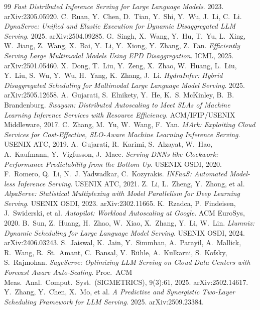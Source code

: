 \begin{thebibliography}{99}
\emph{Fast Distributed Inference Serving for Large Language Models}.
2023. arXiv:2305.05920.
C.~Ruan, Y.~Chen, D.~Tian, Y.~Shi, Y.~Wu, J.~Li, C.~Li.
\emph{DynaServe: Unified and Elastic Execution for Dynamic Disaggregated
LLM Serving}.
2025. arXiv:2504.09285.
G.~Singh, X.~Wang, Y.~Hu, T.~Yu, L.~Xing, W.~Jiang, Z.~Wang, X.~Bai,
Y.~Li, Y.~Xiong, Y.~Zhang, Z.~Fan.
\emph{Efficiently Serving Large Multimodal Models Using EPD
Disaggregation}.
ICML, 2025. arXiv:2501.05460.
X.~Dong, T.~Liu, Y.~Zeng, X.~Zhao, W.~Huang, L.~Liu, Y.~Liu, S.~Wu,
Y.~Wu, H.~Yang, K.~Zhang, J.~Li.
\emph{HydraInfer: Hybrid Disaggregated Scheduling for Multimodal Large
Language Model Serving}.
2025. arXiv:2505.12658.
A.~Gujarati, S.~Elnikety, Y.~He, K.~S. McKinley, B.~B. Brandenburg.
\emph{Swayam: Distributed Autoscaling to Meet SLAs of Machine Learning
Inference Services with Resource Efficiency}.
ACM/IFIP/USENIX Middleware, 2017.
C.~Zhang, M.~Yu, W.~Wang, F.~Yan.
\emph{MArk: Exploiting Cloud Services for Cost-Effective, SLO-Aware
Machine Learning Inference Serving}.
USENIX ATC, 2019.
A.~Gujarati, R.~Karimi, S.~Alzayat, W.~Hao, A.~Kaufmann, Y.~Vigfusson,
J.~Mace.
\emph{Serving DNNs like Clockwork: Performance Predictability from the
Bottom Up}.
USENIX OSDI, 2020.
F.~Romero, Q.~Li, N.~J. Yadwadkar, C.~Kozyrakis.
\emph{INFaaS: Automated Model-less Inference Serving}.
USENIX ATC, 2021.
Z.~Li, L.~Zheng, Y.~Zhong, et al.
\emph{AlpaServe: Statistical Multiplexing with Model Parallelism for Deep
Learning Serving}.
USENIX OSDI, 2023. arXiv:2302.11665.
K.~Rzadca, P.~Findeisen, J.~Swiderski, et al.
\emph{Autopilot: Workload Autoscaling at Google}.
ACM EuroSys, 2020.
B.~Sun, Z.~Huang, H.~Zhao, W.~Xiao, X.~Zhang, Y.~Li, W.~Lin.
\emph{Llumnix: Dynamic Scheduling for Large Language Model Serving}.
USENIX OSDI, 2024. arXiv:2406.03243.
S.~Jaiswal, K.~Jain, Y.~Simmhan, A.~Parayil, A.~Mallick, R.~Wang,
R.~St.~Amant, C.~Bansal, V.~R\"uhle, A.~Kulkarni, S.~Kofsky,
S.~Rajmohan.
\emph{SageServe: Optimizing LLM Serving on Cloud Data Centers with
Forecast Aware Auto-Scaling}.
Proc.\ ACM Meas.\ Anal.\ Comput.\ Syst.\ (SIGMETRICS), 9(3):61, 2025.
arXiv:2502.14617.
Y.~Zhang, Y.~Chen, X.~Mo, et al.
\emph{A Predictive and Synergistic Two-Layer Scheduling Framework for LLM
Serving}.
2025. arXiv:2509.23384.

\end{thebibliography}
